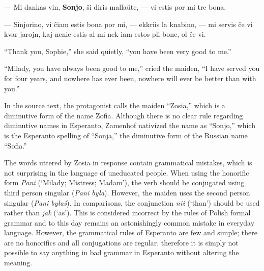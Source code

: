 --- Mi dankas vin, \textbf{Sonjo}, ŝi diris mallaŭte, --- vi estis por mi tre bona.

--- Sinjorino, vi ĉiam estis bona por mi, --- ekkriis la knabino, --- mi servis ĉe vi kvar jarojn, kaj nenie estis al mi nek iam estos pli bone, ol ĉe vi.

``Thank you, Sophie,'' she said quietly, ``you have been very good to me.''

``Milady, you have always been good to me,'' cried the maiden, ``I have served you for four years, and nowhere has ever been, nowhere will ever be better than with you.''

In the source text, the protagonist calls the maiden ``Zosia,'' which is a diminutive form of the name Zofia.
Although there is no clear rule regarding diminutive names in Esperanto, Zamenhof nativized the name as ``Sonjo,'' which is the Esperanto spelling of ``Sonja,'' the diminutive form of the Russian name ``Sofia.''

The words uttered by Zosia in response contain grammatical mistakes, which is not surprising in the language of uneducated people.
When using the honorific form \textit{Pani} (`Milady; Mistress; Madam'), the verb should be conjugated using third person singular (\textit{Pani była}).
However, the maiden uses the second person singular (\textit{Pani byłaś}).
In comparisons, the conjunction \textit{niż} (`than') should be used rather than \textit{jak} (`as').
This is considered incorrect by the rules of Polish formal grammar and to this day remains an astonishingly common mistake in everyday language.
However, the grammatical rules of Esperanto are few and simple; there are no honorifics and all conjugations are regular, therefore it is simply not possible to say anything in bad grammar in Esperanto without altering the meaning.
